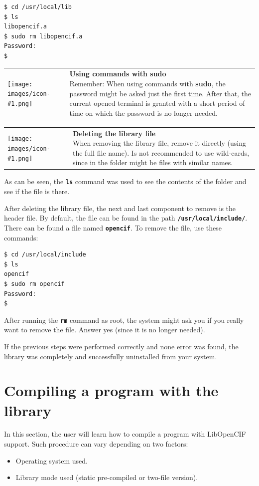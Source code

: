 \documentclass[11pt,twoside,openany,x11names,svgnames]{memoir}
\makeatletter
\newcommand{\IconNote}[3]
{
	\begin{table}[ht]
	\begin{tabular}{ lm{\dimexpr\textwidth-8\tabcolsep-\wd0}@{}}
		\toprule
		\texttt{[image: images/icon-\#1.png]}
		&
		\parbox[t]{155mm}{
		\textbf{#2} \\
		#3
		}
	\end{tabular}
\end{table}
}
\makeatother
\begin{document}
\begin{lstlisting}[frame=single,style=SystemCommandStyle]
$ cd /usr/local/lib
$ ls
libopencif.a
$ sudo rm libopencif.a
Password:
$
\end{lstlisting}

\IconNote
	{warning}
	{Using commands with sudo}
	{Remember: When using commands with \textbf{sudo}, the password might be asked just the first time. After that, the current opened terminal is granted with a short period of time on which the password is no longer needed.}

\IconNote
	{info}
	{Deleting the library file}
	{When removing the library file, remove it directly (using the full file name). Is not recommended to use wild-cards, since in the folder might be files with similar names.}

As can be seen, the \textbf{\texttt{ls}} command was used to see the contents of the folder and see if the file is there.

After deleting the library file, the next and last component to remove is the header file.  By default, the file can be found in the path \textbf{\texttt{/usr/local/include/}}. There can be found a file named \textbf{\texttt{opencif}}. To remove the file, use these commands:

\begin{lstlisting}[frame=single,style=SystemCommandStyle]
$ cd /usr/local/include
$ ls
opencif
$ sudo rm opencif
Password:
$
\end{lstlisting}

After running the \textbf{\texttt{rm}} command as root, the system might ask you if you really want to remove the file. Answer yes (since it is no longer needed).

If the previous steps were performed correctly and none error was found, the library was completely and successfully uninstalled from your system.

\section{Compiling a program with the library}\label{Compiling-a-program}

In this section, the user will learn how to compile a program with LibOpenCIF support. Such procedure can vary depending on two factors:

\begin{itemize}
	\item Operating system used.
	\item Library mode used (static pre-compiled or two-file version).
\end{itemize}
\end{document}
